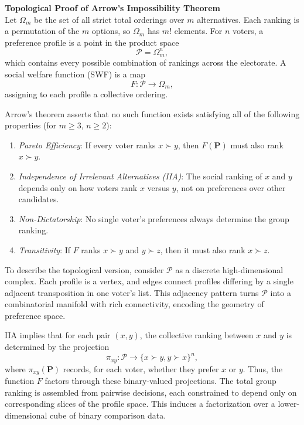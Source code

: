 \begin{technical}
{\Large\textbf{Topological Proof of Arrow’s Impossibility Theorem}}\\[0.7em]

Let \(\Omega_m\) be the set of all strict total orderings over \(m\) alternatives. Each ranking is a permutation of the \(m\) options, so \(\Omega_m\) has \(m!\) elements. For \(n\) voters, a preference profile is a point in the product space
\[
\mathcal{P} = \Omega_m^n,
\]
which contains every possible combination of rankings across the electorate. A social welfare function (SWF) is a map
\[
F : \mathcal{P} \to \Omega_m,
\]
assigning to each profile a collective ordering. 

Arrow’s theorem asserts that no such function exists satisfying all of the following properties (for \(m \geq 3\), \(n \geq 2\)):

\begin{enumerate}
    \item \textit{Pareto Efficiency}: If every voter ranks \(x \succ y\), then \(F(\mathbf{P})\) must also rank \(x \succ y\).
    \item \textit{Independence of Irrelevant Alternatives (IIA)}: The social ranking of \(x\) and \(y\) depends only on how voters rank \(x\) versus \(y\), not on preferences over other candidates.
    \item \textit{Non-Dictatorship}: No single voter’s preferences always determine the group ranking.
    \item \textit{Transitivity}: If \(F\) ranks \(x \succ y\) and \(y \succ z\), then it must also rank \(x \succ z\).
\end{enumerate}

To describe the topological version, consider \(\mathcal{P}\) as a discrete high-dimensional complex. Each profile is a vertex, and edges connect profiles differing by a single adjacent transposition in one voter’s list. This adjacency pattern turns \(\mathcal{P}\) into a combinatorial manifold with rich connectivity, encoding the geometry of preference space.

IIA implies that for each pair \((x,y)\), the collective ranking between \(x\) and \(y\) is determined by the projection
\[
\pi_{xy} : \mathcal{P} \to \{ \text{$x \succ y$}, \text{$y \succ x$} \}^n,
\]
where \(\pi_{xy}(\mathbf{P})\) records, for each voter, whether they prefer \(x\) or \(y\). Thus, the function \(F\) factors through these binary-valued projections. The total group ranking is assembled from pairwise decisions, each constrained to depend only on corresponding slices of the profile space. This induces a factorization over a lower-dimensional cube of binary comparison data.


\end{technical}
